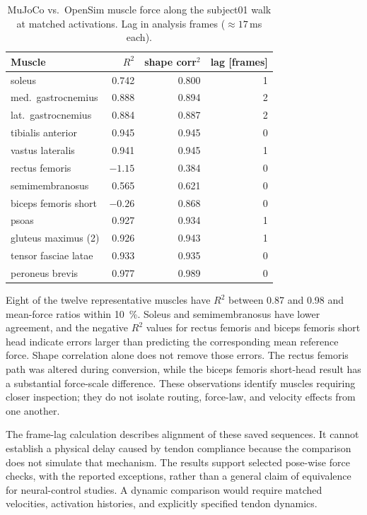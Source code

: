 \begin{table}[htbp]
  \centering
  \caption{MuJoCo vs.\ OpenSim muscle force along the subject01 walk at
  matched activations. Lag in analysis frames ($\approx 17$\,ms each).}
  \label{tab:force-r2}
  \small
  \begin{tabular}{lrrr}
    \toprule
    Muscle & $R^2$ & shape corr$^2$ & lag [frames] \\
    \midrule
    soleus   & 0.742 & 0.800 & 1 \\
    med.\ gastrocnemius & 0.888 & 0.894 & 2 \\
    lat.\ gastrocnemius & 0.884 & 0.887 & 2 \\
    tibialis anterior & 0.945 & 0.945 & 0 \\
    vastus lateralis & 0.941 & 0.945 & 1 \\
    rectus femoris & $-1.15$ & 0.384 & 0 \\
    semimembranosus & 0.565 & 0.621 & 0 \\
    biceps femoris short & $-0.26$ & 0.868 & 0 \\
    psoas & 0.927 & 0.934 & 1 \\
    gluteus maximus (2) & 0.926 & 0.943 & 1 \\
    tensor fasciae latae & 0.933 & 0.935 & 0 \\
    peroneus brevis & 0.977 & 0.989 & 0 \\
    \bottomrule
  \end{tabular}
\end{table}

Eight of the twelve representative muscles have $R^2$ between 0.87 and 0.98 and mean-force ratios within \qty{10}{\percent}. Soleus and semimembranosus have lower agreement, and the negative $R^2$ values for rectus femoris and biceps femoris short head indicate errors larger than predicting the corresponding mean reference force. Shape correlation alone does not remove those errors. The rectus femoris path was altered during conversion, while the biceps femoris short-head result has a substantial force-scale difference. These observations identify muscles requiring closer inspection; they do not isolate routing, force-law, and velocity effects from one another.

The frame-lag calculation describes alignment of these saved sequences. It cannot establish a physical delay caused by tendon compliance because the comparison does not simulate that mechanism. The results support selected pose-wise force checks, with the reported exceptions, rather than a general claim of equivalence for neural-control studies. A dynamic comparison would require matched velocities, activation histories, and explicitly specified tendon dynamics.

